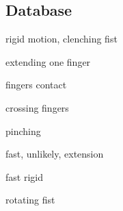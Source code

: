 

\subsection{Database}
\begin{description}[labelsep=0em,labelwidth=.4in,labelindent=1cm]
\item[tayl1] rigid motion, clenching fist
\item[srid1] extending one finger
\item[srid2] fingers contact
\item[srid3] crossing fingers
\item[srid4] pinching
\item[shar1] fast, unlikely, extension
\item[shar2] fast rigid 
\item[shar3] rotating fist
\end{description}


